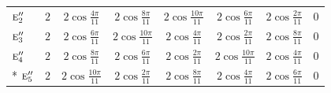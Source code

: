 \documentclass[10pt,a4paper]{article}
\numberwithin{equation}{section}
\newcommand{\irr}[1]{\text{\normalfont\scshape #1}}
\begin{document}
{{\begin{longtable}{@{}lccccccc@{}}
$\irr{e}_{2}''$ & $2$ & $2\cos\tfrac{4\pi}{11}$ & $2\cos\tfrac{8\pi}{11}$ & $2\cos\tfrac{10\pi}{11}$ & $2\cos\tfrac{6\pi}{11}$ & $2\cos\tfrac{2\pi}{11}$ & $0$\\
$\irr{e}_{3}''$ & $2$ & $2\cos\tfrac{6\pi}{11}$ & $2\cos\tfrac{10\pi}{11}$ & $2\cos\tfrac{4\pi}{11}$ & $2\cos\tfrac{2\pi}{11}$ & $2\cos\tfrac{8\pi}{11}$ & $0$\\
$\irr{e}_{4}''$ & $2$ & $2\cos\tfrac{8\pi}{11}$ & $2\cos\tfrac{6\pi}{11}$ & $2\cos\tfrac{2\pi}{11}$ & $2\cos\tfrac{10\pi}{11}$ & $2\cos\tfrac{4\pi}{11}$ & $0$\\*
$\irr{e}_{5}''$ & $2$ & $2\cos\tfrac{10\pi}{11}$ & $2\cos\tfrac{2\pi}{11}$ & $2\cos\tfrac{8\pi}{11}$ & $2\cos\tfrac{4\pi}{11}$ & $2\cos\tfrac{6\pi}{11}$ & $0$\\
\bottomrule\end{longtable}}}
\end{document}
